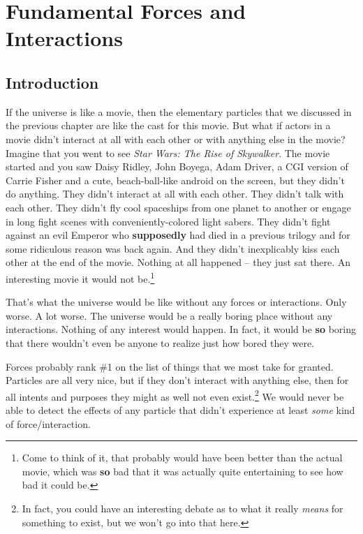 


\chapter[Fund.\ Forces and Interactions]{Fundamental Forces and Interactions}
\label{chapter:quarks}

\section{Introduction}
\label{sec:quarks_intro}

If the universe is like a movie, then the elementary particles
that we discussed in the previous chapter are like the cast for
this movie.  But what if actors in a movie didn't interact at all
with each other or with anything else in the movie?  Imagine that
you went to see {\it Star Wars:  The Rise of Skywalker}.
The movie started and you saw Daisy Ridley, John Boyega, 
Adam Driver, a CGI version of Carrie Fisher and a cute, beach-ball-like android 
on the screen, but they didn't do anything.  They
didn't interact at all with each other.  They didn't talk with
each other.  They didn't fly cool spaceships from one planet to
another or engage in long fight scenes with conveniently-colored
light sabers.  They didn't fight against an evil Emperor who {\bf supposedly}
had died in a previous trilogy and for some ridiculous reason was
back again.  And they didn't inexplicably kiss each other at the
end of the movie. Nothing at all happened -- they just sat there.   An
interesting movie it would not be.\footnote{Come to think of it, that probably
would have been better than the actual movie, which was {\bf so}
bad that it was actually quite entertaining to see how bad it could
be.}

That's what the universe would be like without any forces or
interactions.  Only worse.  A lot worse.  The universe would be a
really boring place without any interactions.  Nothing of any
interest would happen.  In fact, it would be {\bf so} boring that
there wouldn't even be anyone to realize just how bored they were.

Forces probably rank \#1 on the list of things that we most take
for granted.  Particles are all very nice, but if they don't
interact with anything else, then for all intents and purposes
they might as well not even exist.\footnote{In fact, you could
have an interesting debate as to what it really {\it means} for
something to exist, but we won't go into that here.} We would
never be able to detect the effects of any particle that didn't
experience at least {\it some} kind of force/interaction.

